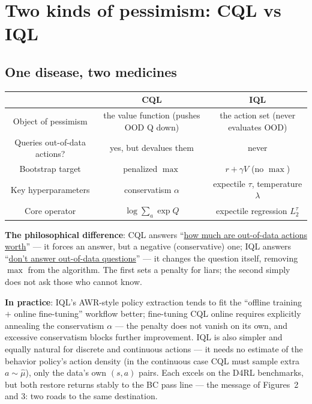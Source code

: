 \documentclass{article}
\begin{document}
\section*{Two kinds of pessimism: CQL vs IQL}

\subsection*{One disease, two medicines}

\begin{center}
\begin{tabular}{c|c|c}
 & \textbf{CQL} & \textbf{IQL} \\
\hline
Object of pessimism & the value function (pushes OOD Q down) & the action set (never evaluates OOD) \\
Queries out-of-data actions? & yes, but devalues them & never \\
Bootstrap target & penalized $\max$ & $r + \gamma V$ (no $\max$) \\
Key hyperparameters & conservatism $\alpha$ & expectile $\tau$, temperature $\lambda$ \\
Core operator & $\log\sum_a\exp Q$ & expectile regression $L_2^\tau$ \\
\end{tabular}
\end{center}

\textbf{The philosophical difference}: CQL answers ``\underline{how much are out-of-data actions worth}'' --- it forces an answer, but a negative (conservative) one; IQL answers ``\underline{don't answer out-of-data questions}'' --- it changes the question itself, removing $\max$ from the algorithm. The first sets a penalty for liars; the second simply does not ask those who cannot know.

\textbf{In practice}: IQL's AWR-style policy extraction tends to fit the ``offline training $+$ online fine-tuning'' workflow better; fine-tuning CQL online requires explicitly annealing the conservatism $\alpha$ --- the penalty does not vanish on its own, and excessive conservatism blocks further improvement. IQL is also simpler and equally natural for discrete and continuous actions --- it needs no estimate of the behavior policy's action density (in the continuous case CQL must sample extra $a\sim\hat\mu$), only the data's own $(s,a)$ pairs. Each excels on the D4RL benchmarks, but both restore returns stably to the BC pass line --- the message of Figures~2 and 3: two roads to the same destination.
\end{document}
